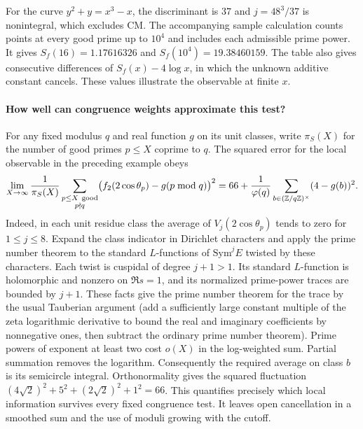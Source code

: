 For the curve $y^2+y=x^3-x$, the discriminant is $37$ and
$j=48^3/37$ is nonintegral, which excludes CM. The accompanying
sample calculation counts points at every good prime up to $10^4$
and includes each admissible prime power. It gives
$S_f(16)=1.17616326$ and $S_f(10^4)=19.38460159$.
The table also gives consecutive differences of $S_f(x)-4\log x$,
in which the unknown additive constant cancels. These values illustrate
the observable at finite $x$.

\paragraph{How well can congruence weights approximate this test?}
For any fixed modulus $q$ and real function $g$ on its unit classes, write
$\pi_S(X)$ for the number of good primes $p\le X$ coprime to $q$.
The squared error for the local observable in the preceding example obeys
\[
 \lim_{X\to\infty}\frac{1}{\pi_S(X)}
 \sum_{\substack{p\le X\ {\rm good}\\p\nmid q}}
 \bigl(f_2(2\cos\theta_p)-g(p\bmod q)\bigr)^2
 =
 66+\frac1{\varphi(q)}\sum_{b\in(\mathbb Z/q\mathbb Z)^\times}
 (4-g(b))^2 .
\]
Indeed, in each unit residue class the average of
$V_j(2\cos\theta_p)$ tends to zero for $1\le j\le8$. Expand the class
indicator in Dirichlet characters and apply the prime number theorem to
the standard $L$-functions of $\mathrm{Sym}^j E$ twisted by these characters.
Each twist is cuspidal of degree $j+1>1$. Its standard $L$-function is
holomorphic and nonzero on $\Re s=1$, and its normalized prime-power traces
are bounded by $j+1$. These facts give the prime number theorem for the
trace by the usual Tauberian argument (add a sufficiently large constant
multiple of the zeta logarithmic derivative to bound the real and imaginary
coefficients by nonnegative ones, then subtract the ordinary prime number
theorem). Prime powers of exponent at least two cost $o(X)$ in the
log-weighted sum. Partial summation removes the logarithm.
Consequently the required average on class $b$ is its semicircle integral.
Orthonormality gives the squared fluctuation
$(4\sqrt2)^2+5^2+(2\sqrt2)^2+1^2=66$.
This quantifies precisely which local information survives every fixed
congruence test. It leaves open cancellation in a smoothed sum and the use
of moduli growing with the cutoff.
